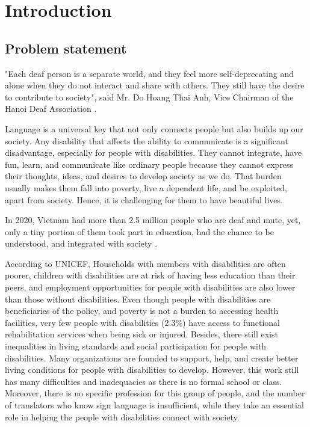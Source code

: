 \chapter{Introduction}
	
\section{Problem statement}

"Each deaf person is a separate world, and they feel more self-deprecating and alone when they do not interact and share with others. They still have the desire to contribute to society", said Mr. Do Hoang Thai Anh, Vice Chairman of the Hanoi Deaf Association \cite{MoCanhCuaHyVong}.

Language is a universal key that not only connects people but also builds up our society. Any disability that affects the ability to communicate is a significant disadvantage, especially for people with disabilities. They cannot integrate, have fun, learn, and communicate like ordinary people because they cannot express their thoughts, ideas, and desires to develop society as we do. That burden usually makes them fall into poverty, live a dependent life, and be exploited, apart from society. Hence, it is challenging for them to have beautiful lives.

In 2020, Vietnam had more than 2.5 million people who are deaf and mute, yet, only a tiny portion of them took part in education, had the chance to be understood, and integrated with society \cite{ThieuPhienDich}.

According to UNICEF, Households with members with disabilities are often poorer, children with disabilities are at risk of having less education than their peers, and employment opportunities for people with disabilities are also lower than those without disabilities. Even though people with disabilities are beneficiaries of the policy, and poverty is not a burden to accessing health facilities, very few people with disabilities (2.3\%) have access to functional rehabilitation services when being sick or injured. Besides, there still exist inequalities in living standards and social participation for people with disabilities. Many organizations are founded to support, help, and create better living conditions for people with disabilities to develop. However, this work still has many difficulties and inadequacies as there is no formal school or class. Moreover, there is no specific profession for this group of people, and the number of translators who know sign language is insufficient, while they take an essential role in helping the people with disabilities connect with society.

